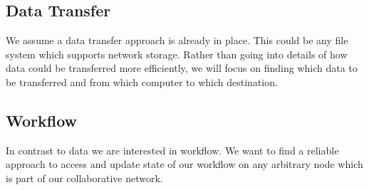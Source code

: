 \subsection{Data Transfer}
We assume a data transfer approach is already in place. This could be any file system which supports 
network storage. Rather than going into details of how data could be transferred more efficiently, we will
focus on finding which data to be transferred and from which computer to which destination.

\subsection{Workflow}
In contrast to data we are interested in workflow. We want to find a reliable approach to access and update 
state of our workflow on any arbitrary node which is part of our collaborative network.